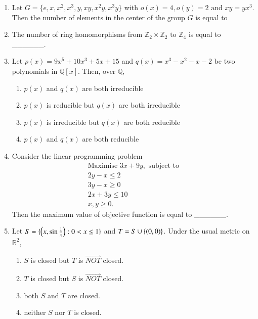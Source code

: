 \documentclass[journal,12pt,onecolumn]{IEEEtran}
\theoremstyle{remark}
\begin{document}
\begin{enumerate}
\item Let $G = \{e,x,x^{2},x^{3},y,xy,x^{2}y,x^{3}y\}$ with $o(x) = 4,o(y)=2 \text{ and } xy = yx^{3}$. Then the number of elements in the center of the group $G$ is equal to
\begin{enumerate}
\end{enumerate}

\item The number of ring homomorphisms from $\mathbb{Z}_2 \times \mathbb{Z}_2 \text{ to } \mathbb{Z}_4$ is equal to \_\_\_\_\_\_.\\

\item Let $p(x) = 9x^{5} + 10x^{3} + 5x + 15$ and $q(x) = x^{3} - x^{2} - x -2$ be two polynomials in $\mathbb{Q}[x]$. Then, over $\mathbb{Q}$,
\begin{enumerate}
	\item $p(x)$ and $q(x)$ are both irreducible 
	\item $p(x)$ is reducible but $q(x)$ are both irreducible 
	\item $p(x)$ is irreducible but $q(x)$ are both reducible 
	\item $p(x)$ and $q(x)$ are both reducible 
\end{enumerate}

\item Consider the linear programming problem\\
\begin{align*}
	\text{Maximise } 3x+9y, \text{ subject to}\\
	2y-x \leq 2\\
	3y-x \geq 0\\
	2x+3y \leq 10\\
	x,y \geq 0.
\end{align*}
Then the maximum value of objective function is equal to \_\_\_\_\_\_.\\

\item Let $S = \{\left(x,\sin{\frac{1}{x}}\right): 0 < x \leq 1 \}$ and $T = S \cup \{\left(0,0\right)\}$. Under the usual metric on $\mathbb{R}^{2}$,
\begin{enumerate}
	\item $S$ is closed but $T$ is $\vec{NOT}$ closed.
	\item $T$ is closed but $S$ is $\vec{NOT}$ closed.
	\item both $S$ and $T$ are closed.
	\item neither $S$ nor $T$ is closed.
\end{enumerate}
\end{enumerate}
\end{document}
